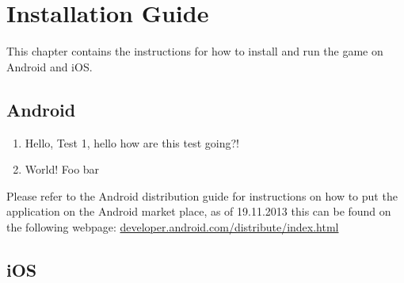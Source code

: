 \chapter{Installation Guide}

This chapter contains the instructions for how to install and run the game on 
Android and iOS.

\section{Android}

\begin{enumerate}
	\item{Hello,}
	Test 1, hello
	how are this test
	going?!
	\item{World!}
	Foo
	bar
\end{enumerate}

Please refer to the Android distribution guide for instructions on how to put 
the application on the Android market place, as of 19.11.2013 this can be found 
on the following webpage: \href{http://developer.android.com/distribute/index.h //
tml}{developer.android.com/distribute/index.html}

\section{iOS}
